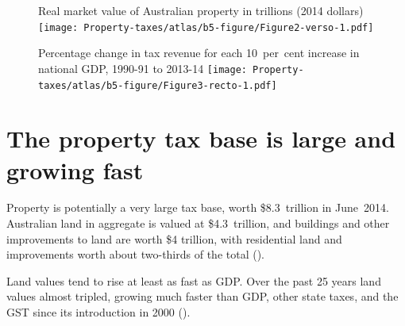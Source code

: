 \documentclass[twoside,english]{palatinob5portrait}
\begin{document}
\begin{figure}
%
{Real market value of Australian property in trillions (2014 dollars)}%
\texttt{[image: Property-taxes/atlas/b5-figure/Figure2-verso-1.pdf]}
\end{figure}

\begin{figure}
\vspace{1.35\baselineskip} %
%
{Percentage change in tax revenue for each 10~per~cent increase in national GDP, 1990-91 to 2013-14}
\texttt{[image: Property-taxes/atlas/b5-figure/Figure3-recto-1.pdf]}


\end{figure}



\section{The property tax base is large and growing fast\label{sec:PROP-3-2}}
Property is potentially a very large tax base, worth \$8.3~trillion in June~2014. Australian land in aggregate is valued at \$4.3~trillion, and buildings and other improvements to land are worth \$4 trillion, with residential land and improvements worth about two-thirds of the total (). \enlargethispage{0.5\baselineskip} \enlargethispage*{0.5\baselineskip}



Land values tend to rise at least as fast as GDP\@. Over the past 25 years land values almost tripled, growing much faster than GDP, other state taxes, and the GST since its introduction in 2000 ().  
\end{document}
